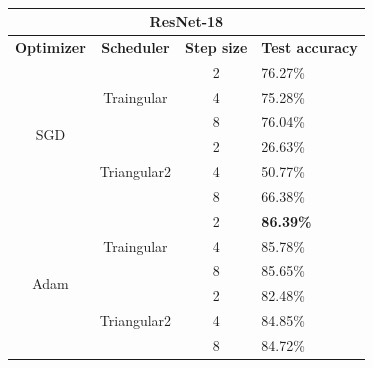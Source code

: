 \begin{table}[ht!]
\centering
\caption{}
\label{tab:resnet}
\begin{tabular}{|ccll|}
\hline
\multicolumn{4}{|c|}{\textbf{ResNet-18}}                                          \\ \hline
\multicolumn{1}{|c|}{\textbf{Optimizer}}    & \multicolumn{1}{c|}{\textbf{Scheduler}}           & \multicolumn{1}{c|}{\textbf{Step size}} & \textbf{Test accuracy} \\ \hline
\multicolumn{1}{|c|}{\multirow{6}{*}{SGD}}  & \multicolumn{1}{c|}{\multirow{3}{*}{Traingular}}  & \multicolumn{1}{c|}{2}                  &  76.27\%                \\ \cline{3-4} 
\multicolumn{1}{|c|}{} & \multicolumn{1}{c|}{} & \multicolumn{1}{c|}{4} & 75.28\% \\ \cline{3-4} 
\multicolumn{1}{|c|}{} & \multicolumn{1}{c|}{} & \multicolumn{1}{c|}{8} & 76.04\% \\ \cline{2-4} 
\multicolumn{1}{|c|}{}                      & \multicolumn{1}{c|}{\multirow{3}{*}{Triangular2}} & \multicolumn{1}{c|}{2}                  &  26.63\%               \\ \cline{3-4} 
\multicolumn{1}{|c|}{} & \multicolumn{1}{c|}{} & \multicolumn{1}{c|}{4} & 50.77\% \\ \cline{3-4} 
\multicolumn{1}{|c|}{} & \multicolumn{1}{c|}{} & \multicolumn{1}{c|}{8} & 66.38\% \\ \hline
\multicolumn{1}{|c|}{\multirow{6}{*}{Adam}} & \multicolumn{1}{c|}{\multirow{3}{*}{Traingular}}  & \multicolumn{1}{c|}{2}                  & \textbf{86.39\%}       \\ \cline{3-4} 
\multicolumn{1}{|c|}{} & \multicolumn{1}{c|}{} & \multicolumn{1}{c|}{4} & 85.78\% \\ \cline{3-4} 
\multicolumn{1}{|c|}{} & \multicolumn{1}{c|}{} & \multicolumn{1}{c|}{8} & 85.65\% \\ \cline{2-4} 
\multicolumn{1}{|c|}{}                      & \multicolumn{1}{c|}{\multirow{3}{*}{Triangular2}} & \multicolumn{1}{c|}{2}                  & 82.48\%                \\ \cline{3-4} 
\multicolumn{1}{|c|}{} & \multicolumn{1}{c|}{} & \multicolumn{1}{c|}{4} & 84.85\% \\ \cline{3-4} 
\multicolumn{1}{|c|}{} & \multicolumn{1}{c|}{} & \multicolumn{1}{c|}{8} & 84.72\% \\ \hline
\end{tabular}
\end{table}




